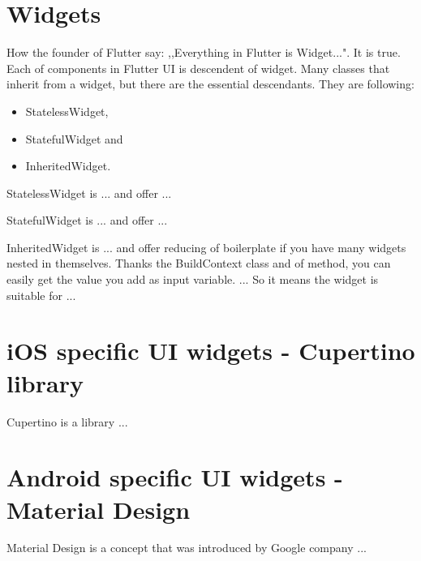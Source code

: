 \section{Widgets}\label{sec:widgets}
How the founder of Flutter say: ,,Everything in Flutter is Widget...".
It is true.
Each of components in Flutter UI is descendent of widget.
Many classes that inherit from a widget, but there are the essential descendants.
They are following:
\begin{itemize}
    \item StatelessWidget,
    \item StatefulWidget and
    \item InheritedWidget.
\end{itemize}{}
StatelessWidget is ... and offer ... \cite{statelessWidget}

StatefulWidget is ... and offer ... \cite{statefulWidget}

InheritedWidget is ... and offer reducing of boilerplate if you have many widgets nested in themselves.
Thanks the BuildContext class and of method, you can easily get the value you add as input variable.
... \cite{inheritedWidget}
So it means the widget is suitable for ...


\section{iOS specific UI widgets - Cupertino library}\label{sec:ios-specific-ui-widgets}
Cupertino is a library ...


\section{Android specific UI widgets - Material Design}\label{sec:android-specific-ui-widgets}
Material Design is a concept that was introduced by Google company ...
